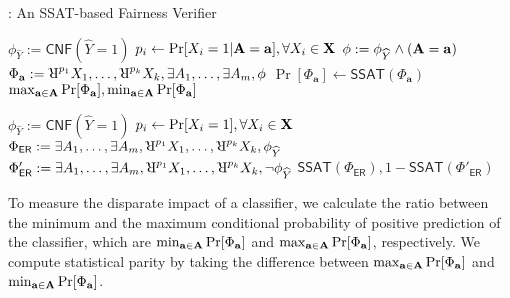 \begin{algorithm}[t!]
	\caption{\justicia: An SSAT-based Fairness Verifier}
	\label{fairness_justicia_algo:enum}
	\begin{algorithmic}[1]
		\label{fairness_justicia_algo:justicia_enum_begin}
		\State $ \phi_{\widehat{Y}} := \mathsf{CNF}(\widehat{Y} = 1) $
		\State $ p_{i} \leftarrow \Pr[X_i = 1|\mathbf{A} = \mathbf{a}], \forall X_i \in \mathbf{X} $
		\State $ \phi := \phi_{\widehat{Y}} \wedge (\mathbf{A} =\mathbf{a}) $
		\State $  \Phi_\mathbf{a} := \R^{p_{1}}X_1, \dots, \R^{p_{\numnonsensitive}}X_{\numnonsensitive}, \exists A_1,\dots, \exists A_{\numsensitive},  \phi $
		\State $ \Pr[\Phi_\mathbf{a}]  \leftarrow \mathsf{SSAT}(\Phi_\mathbf{a}) $ 
		\EndFor
		\State\Return $ \max_{\mathbf{a} \in \mathbf{A}} \Pr[\Phi_{\mathbf{a}}], \min_{\mathbf{a} \in \mathbf{A}} \Pr[\Phi_{\mathbf{a}}] $
		\label{fairness_justicia_algo:justicia_enum_end}
		\EndFunction
		\Statex
		
		
		
		\label{fairness_justicia_algo:justicia_learn_begin}
		\State $ \phi_{\widehat{Y}} := \mathsf{CNF}(\widehat{Y}  = 1) $
		\State $ p_{i} \leftarrow \Pr[X_i=1], \forall X_i \in \mathbf{X} $
		\State $  \Phi_\mathsf{ER} := \exists A_1,\dots, \exists A_{\numsensitive}, \R^{p_{1}}X_1, \dots, \R^{p_{\numnonsensitive}}X_{\numnonsensitive}, \phi_{\widehat{Y}} $
		\State $  \Phi'_\mathsf{ER} := \exists A_1,\dots, \exists A_{\numsensitive}, \R^{p_{1}}X_1, \dots, \R^{p_{\numnonsensitive}}X_{\numnonsensitive}, \neg \phi_{\widehat{Y}} $
		\State\Return $ \mathsf{SSAT}(\Phi_\mathsf{ER}), 1 - \mathsf{SSAT}(\Phi'_\mathsf{ER}) $
		\label{fairness_justicia_algo:justicia_learn_end}
		\EndFunction
	\end{algorithmic}

\end{algorithm}


To measure the disparate impact of a classifier, we calculate the ratio between the minimum and the maximum conditional probability of positive prediction of the classifier, which are  $ \min_{\mathbf{a} \in \mathbf{A}} \Pr[\Phi_{\mathbf{a}}] $ and $ \max_{\mathbf{a} \in \mathbf{A}} \Pr[\Phi_{\mathbf{a}}] $, respectively. We compute statistical parity by taking the difference between $ \max_{\mathbf{a} \in \mathbf{A}} \Pr[\Phi_{\mathbf{a}}] $ and $ \min_{\mathbf{a} \in \mathbf{A}} \Pr[\Phi_{\mathbf{a}}] $. 


